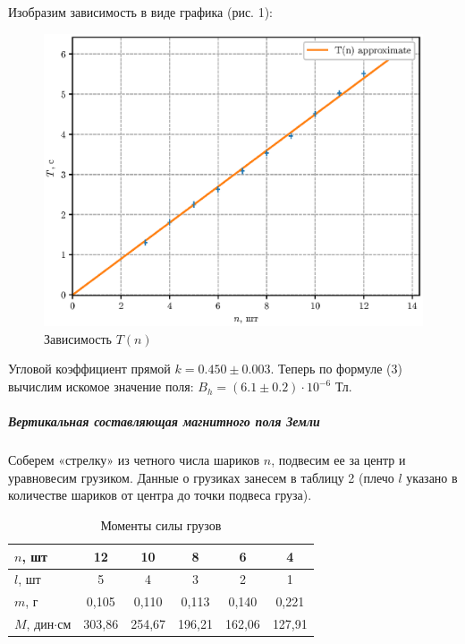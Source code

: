 \documentclass[12pt,a4paper]{article}
\begin{document}
Изобразим зависимость в виде графика (рис. 1):
\begin{figure}[H]
    \centering
    \includegraphics[width=0.75\linewidth]{pics/Tn.eps}
    \caption{Зависимость $T(n)$}
\end{figure}
Угловой коэффициент прямой $k = 0.450 \pm 0.003$.
Теперь по формуле (3) вычислим искомое значение поля: $B_h = (6.1 \pm 0.2) \cdot 10^{-6}$ Тл.
\subparagraph*{Вертикальная составляющая магнитного поля Земли}
Соберем «стрелку» из четного числа шариков $n$, подвесим ее за центр и уравновесим грузиком. 
Данные о грузиках занесем в таблицу 2 (плечо $l$ указано в количестве шариков от центра до точки подвеса груза).
\begin{table}[H]
    \centering
    \begin{tabular}{|l|c|c|c|c|c|}
    \hline
    $n$, шт               & 12     & 10    & 8      & 6      & 4      \\ \hline
    $l$, шт               & 5      & 4     & 3      & 2      & 1      \\ \hline
    $m$, г                & 0,105  & 0,110 & 0,113  & 0,140  & 0,221  \\ \hline
    $M$, дин$\cdot$см     & 303,86 & 254,67& 196,21 &162,06  &127,91  \\ \hline
    \end{tabular}
    \caption{Моменты силы грузов}
\end{table}
\end{document}
